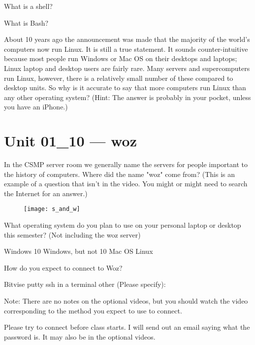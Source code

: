 \documentclass[letterpaper,12pt]{exam}
\begin{document}
\begin{questions}
\question What is a shell?
\vspace{1.5cm}

\question What is Bash? 
\vspace{1.5cm}


\question About 10 years ago the announcement was made that the majority of the world's computers now run Linux.  It is still a true statement.  It sounds counter-intuitive because most people run Windows or Mac OS on their desktops and laptops; Linux laptop and desktop users are fairly rare.  Many servers and supercomputers run Linux, however, there is a relatively small number of these compared to desktop units.  So why is it accurate to say that more computers run Linux than any other operating system? (Hint: The answer is probably in your pocket, unless you have an iPhone.) 
\vspace{1.5cm}
\section*{Unit 01\_10 --- woz}

\question In the CSMP server room we generally name the servers for people important to the history of computers.  Where did the name "woz" come from?  (This is an example of a question that isn't in the video.  You might or might need to search the Internet for an answer.)
\begin{figure}[h]
	\texttt{[image: s\_and\_w]}
\end{figure}

\question What operating system do you plan to use on your personal laptop or desktop this semester? (Not including the woz server)
\begin{checkboxes}
\choice Windows 10
\choice Windows, but not 10
\choice Mac OS
\choice Linux
\end{checkboxes}

\begin{samepage}
\question How do you expect to connect to Woz? 
\begin{checkboxes}
\choice Bitvise 
\choice putty
\choice ssh in a terminal
\choice other (Please specify):
\end{checkboxes}
\end{samepage}

Note:  There are no notes on the optional videos, but you should watch the video corresponding to the method you expect to use to connect.

Please try to connect before class starts.  I will send out an email saying what the password is.  It may also be in the optional videos.


\end{questions}
\end{document}
